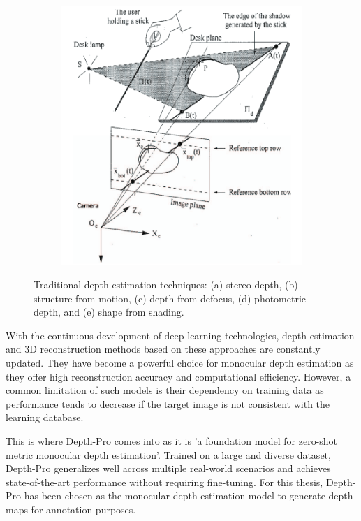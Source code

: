 \begin{figure}[htbp]
\begin{subfigure}[b]{0.18\textwidth}
        \caption{}
        \label{fig:depth_estimation_d}
    \end{subfigure}
    \hfill
    \begin{subfigure}[b]{0.18\textwidth}
        \includegraphics[width=\textwidth]{images/methodology/depth_estimation_e.png}
        \caption{}
        \label{fig:depth_estimation_e}
    \end{subfigure}

    \caption{Traditional depth estimation techniques: (a) stereo-depth, (b) structure from motion, (c) depth-from-defocus, (d) photometric-depth, and (e) shape from shading.}
    \label{fig:depth_estimation}
\end{figure}

With the continuous development of deep learning technologies, depth estimation and 3D reconstruction methods based on these approaches are constantly updated. They have become a powerful choice for monocular depth estimation as they offer high reconstruction accuracy and computational efficiency. However, a common limitation of such models is their dependency on training data as performance tends to decrease if the target image is not consistent with the learning database.

This is where Depth-Pro \cite{depth-pro} comes into as it is 'a foundation model for zero-shot metric monocular depth estimation'. Trained on a large and diverse dataset, Depth-Pro generalizes well across multiple real-world scenarios and achieves state-of-the-art performance without requiring fine-tuning. For this thesis, Depth-Pro has been chosen as the monocular depth estimation model to generate depth maps for annotation purposes.

